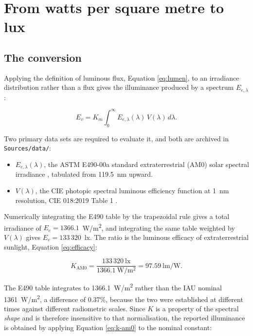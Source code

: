 \section{From watts per square metre to lux}
\label{sec:sun-lux}

\subsection{The conversion}

Applying the definition of luminous flux, Equation \ref{eq:lumen}, to an irradiance distribution rather than a flux gives the illuminance produced by a spectrum $E_{e,\lambda}$:

\begin{equation}
E_v = K_m \int_{0}^{\infty} E_{e,\lambda}(\lambda)\, V(\lambda)\, d\lambda .
\label{eq:lux-from-spectrum}
\end{equation}

Two primary data sets are required to evaluate it, and both are archived in \texttt{Sources/data/}:

\begin{itemize}
    \item $E_{e,\lambda}(\lambda)$, the ASTM E490-00a standard extraterrestrial (AM0) solar spectral irradiance \cite{astm_e490_data}, tabulated from 119.5~nm upward.
    \item $V(\lambda)$, the CIE photopic spectral luminous efficiency function at 1~nm resolution, CIE 018:2019 Table 1 \cite{cie_vlambda}.
\end{itemize}

Numerically integrating the E490 table by the trapezoidal rule gives a total irradiance of $E_e = 1366.1$~W/m\textsuperscript{2}, and integrating the same table weighted by $V(\lambda)$ gives $E_v = 133\,320$~lx. The ratio is the luminous efficacy of extraterrestrial sunlight, Equation \ref{eq:efficacy}:

\begin{equation}
K_{\mathrm{AM0}} = \frac{133\,320~\mathrm{lx}}{1366.1~\mathrm{W/m^2}} = 97.59~\mathrm{lm/W} .
\label{eq:k-am0}
\end{equation}

The E490 table integrates to 1366.1~W/m\textsuperscript{2} rather than the IAU nominal 1361~W/m\textsuperscript{2}, a difference of 0.37\%, because the two were established at different times against different radiometric scales. Since $K$ is a property of the spectral \emph{shape} and is therefore insensitive to that normalisation, the reported illuminance is obtained by applying Equation \ref{eq:k-am0} to the nominal constant:

